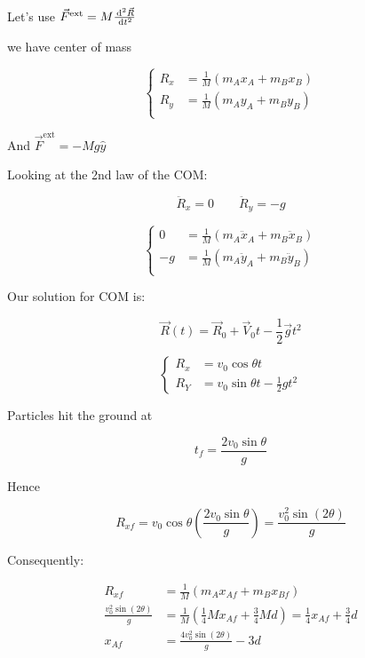 \begin{sol}
	Let's use $\vec F^\mathrm{ext} = M \frac{\D^2 \vec R}{\D t^2}$

	we have center of mass

	\begin{equation}
		\begin{cases}
			R_x &= \frac{1}{M} (m_A x_A + m_B x_B)\\
			R_y &= \frac{1}{M} (m_A y_A + m_B y_B)\\ 
		\end{cases}
	\end{equation}

	And $\vec F^\mathrm{ext} = - Mg\hat y$

	Looking at the 2nd law of the COM:

	\begin{equation}
		\ddot R_x = 0 \qquad \ddot R_y = -g
	\end{equation}

	\begin{equation}
		\begin{cases}
			0 &= \frac{1}{M} (m_A \ddot x_A + m_B \ddot x_B)\\
			-g &= \frac{1}{M} (m_A \ddot y_A + m_B \ddot y_B)\\ 
		\end{cases}
	\end{equation}

	Our solution for COM is:

	\begin{equation}
		\vec R(t) = \vec R_0 + \vec V_0 t - \frac{1}{2} \vec g t^2
	\end{equation}

	\begin{equation}
		\begin{cases}
			R_x &= v_0 \cos \theta t\\
			R_Y &= v_0 \sin\theta t - \frac{1}{2} gt^2
		\end{cases}
	\end{equation}

	Particles hit the ground at

	\begin{equation}
		t_f = \frac{2v_0\sin\theta}{g}
	\end{equation}

	Hence

	\begin{equation}
		R_{xf} = v_0 \cos\theta \left(\frac{2v_0 \sin\theta}{g}\right) = \frac{v_0^2 \sin(2\theta)}{g}
	\end{equation}

	Consequently:

	\begin{align}
		R_{xf} &= \frac{1}{M} (m_A x_{Af} + m_B x_{Bf})\\
		\frac{v_0^2 \sin(2\theta)}{g} &= \frac{1}{M} (\frac{1}{4} M x_{Af} + \frac{3}{4} M d) = \frac{1}{4} x_{Af} + \frac{3}{4} d\\
		x_{Af} &= \boxed{\frac{4v_0^2 \sin(2\theta)}{g} - 3d}
	\end{align}
\end{sol}

